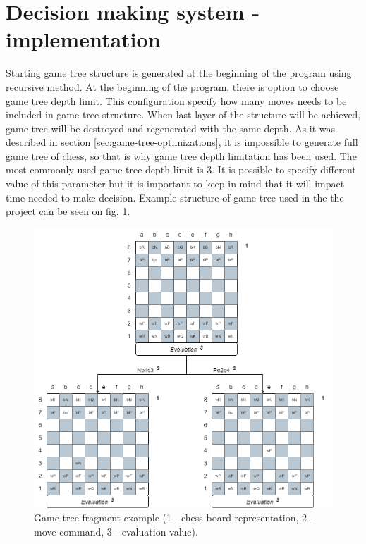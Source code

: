 \section{Decision making system - implementation}
Starting game tree structure is generated at the beginning of the program using recursive method. At the beginning of the program, there is option to choose game tree depth limit. This configuration specify how many moves needs to be included in game tree structure. When last layer of the structure will be achieved, game tree will be destroyed and regenerated with the same depth. As it was described in section \ref{sec:game-tree-optimizations}, it is impossible to generate full game tree of chess, so that is why game tree depth limitation has been used. The most commonly used game tree depth limit is $3$. It is possible to specify different value of this parameter but it is important to keep in mind that it will impact time needed to make decision. Example structure of game tree used in the the project can be seen on \hyperref[fig:game-tree-fragment]{fig.  \ref*{fig:game-tree-fragment}}.
\begin{figure}
	\centering
	\includegraphics[width=\textwidth]{dependencies/pictures/Game_Tree_Fragment_Example.png}
	\caption{Game tree fragment example (1 - chess board representation, 2 - move command, 3 - evaluation value).}
	\label{fig:game-tree-fragment}
\end{figure}

